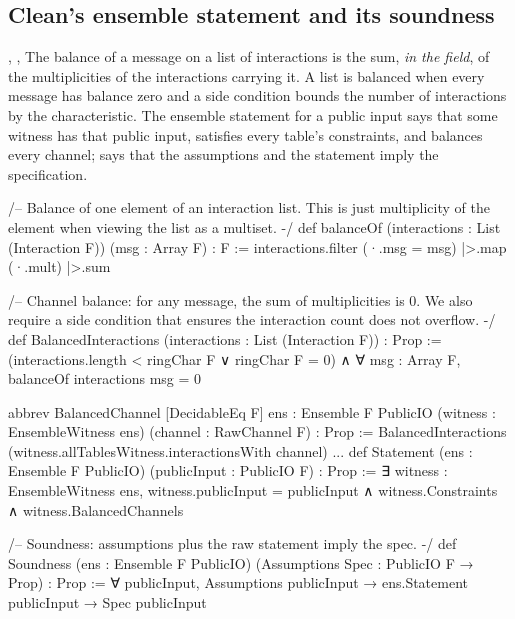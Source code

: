 \subsection{Clean's ensemble statement and its soundness}\label{sec:gen-lib-clean-statement}

\begin{define}{, , }
The balance of a message on a list of interactions is the sum, \emph{in the field}, of the
multiplicities of the interactions carrying it. A list is balanced when every message has balance
zero and a side condition bounds the number of interactions by the characteristic. The ensemble
statement for a public input says that some witness has that public input, satisfies every
table's constraints, and balances every channel;  says that the assumptions and
the statement imply the specification.
\end{define}

\begin{leancode}
/--
Balance of one element of an interaction list.
This is just multiplicity of the element when viewing the list as a multiset.
-/
def balanceOf (interactions : List (Interaction F)) (msg : Array F) : F :=
  interactions.filter (·.msg = msg) |>.map (·.mult) |>.sum

/--
Channel balance: for any message, the sum of multiplicities is 0.
We also require a side condition that ensures the interaction count does not overflow.
-/
def BalancedInteractions (interactions : List (Interaction F)) : Prop :=
  (interactions.length < ringChar F ∨ ringChar F = 0) ∧
  ∀ msg : Array F, balanceOf interactions msg = 0
\end{leancode}



\begin{leancode}
abbrev BalancedChannel [DecidableEq F] {ens : Ensemble F PublicIO} (witness : EnsembleWitness ens)
    (channel : RawChannel F) : Prop :=
  BalancedInteractions (witness.allTablesWitness.interactionsWith channel)
...
def Statement (ens : Ensemble F PublicIO) (publicInput : PublicIO F) : Prop :=
  ∃ witness : EnsembleWitness ens,
    witness.publicInput = publicInput ∧
    witness.Constraints ∧
    witness.BalancedChannels

/-- Soundness: assumptions plus the raw statement imply the spec. -/
def Soundness (ens : Ensemble F PublicIO) (Assumptions Spec : PublicIO F → Prop) : Prop :=
  ∀ publicInput, Assumptions publicInput → ens.Statement publicInput → Spec publicInput
\end{leancode}

